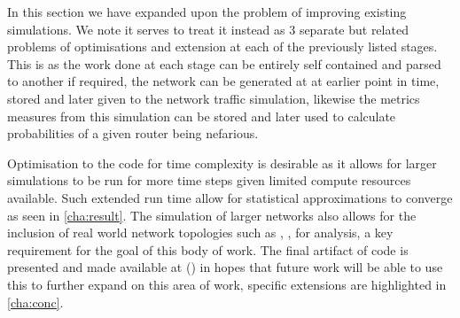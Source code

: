 In this section we have expanded upon the problem of improving existing simulations. We note it serves to treat it instead as 3 separate but related problems of optimisations and extension at each of the previously listed stages. This is as the work done at each stage can be entirely self contained and parsed to another if required, the network can be generated at at earlier point in time, stored and later given to the network traffic simulation, likewise the metrics measures from this simulation can be stored and later used to calculate probabilities of a given router being nefarious.\par
Optimisation to the code for time complexity is desirable as it allows for larger simulations to be run for more time steps given limited compute resources available. Such extended run time allow for statistical approximations to converge as seen in \cref{cha:result}. The simulation of larger networks also allows for the inclusion of real world network topologies such as \cite{cadi_caida_2002}, \cite{university_of_washington_rocketfuel_2002}, \cite{medina_brite_2001} for analysis, a key requirement for the goal of this body of work. The final artifact of code is presented and made available at (\cite{sylvester_millar_real_2021}) in hopes that future work will be able to use this to further expand on this area of work, specific extensions are highlighted in \cref{cha:conc}.